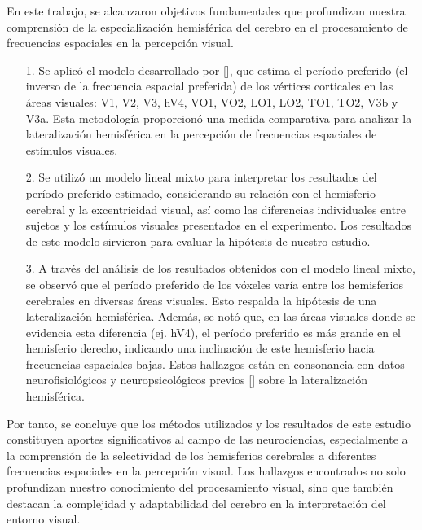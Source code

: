 \begin{conclusions}	
	
		
	En este trabajo, se alcanzaron objetivos fundamentales que profundizan nuestra comprensión de la especialización hemisférica del cerebro en el procesamiento de frecuencias espaciales en la percepción visual.
	 \begin{itemize}
	 	\item[1.] Se aplicó el modelo desarrollado por [\cite{broderick_mapping_2022}], que estima el período preferido (el inverso de la frecuencia espacial preferida) de los vértices corticales en las áreas visuales: V1, V2, V3, hV4, VO1, VO2, LO1, LO2, TO1, TO2, V3b y V3a. Esta metodología proporcionó una medida comparativa para analizar la lateralización hemisférica en la percepción de frecuencias espaciales de estímulos visuales.
	 	\item  [2.] Se utiliz\'o un modelo lineal mixto para interpretar los resultados del período preferido estimado, considerando su relación con el hemisferio cerebral y la excentricidad visual, as\'i como las diferencias individuales entre sujetos y los estímulos visuales presentados en el experimento. Los resultados de este modelo sirvieron para evaluar la hipótesis de nuestro estudio.
	 	
	 	\item [3.] 	A través del análisis de los resultados obtenidos con el modelo lineal mixto, se observ\'o que el período preferido de los vóxeles varía entre los hemisferios cerebrales en diversas áreas visuales. Esto respalda la hipótesis de una lateralización hemisférica. Además, se not\'o que, en las áreas visuales donde se evidencia esta diferencia (ej. hV4), el período preferido es más grande en el hemisferio derecho, indicando una inclinación de este hemisferio hacia frecuencias espaciales bajas. Estos hallazgos están en consonancia con datos neurofisiológicos y neuropsicológicos previos [\cite{flevaris_spatial_2016}] sobre la lateralización hemisférica.
	 	
	 \end{itemize}

	Por tanto, se concluye que los m\'etodos utilizados y los resultados de este estudio constituyen aportes significativos al campo de las neurociencias, especialmente a la comprensión de la selectividad de los hemisferios cerebrales a diferentes frecuencias espaciales en la percepción visual. Los  hallazgos encontrados no solo profundizan nuestro conocimiento del procesamiento visual, sino que también destacan la complejidad y adaptabilidad del cerebro en la interpretación del entorno visual.
	
	 



	
         
         
\end{conclusions}
